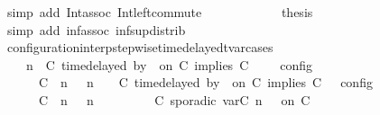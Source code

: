 \begin{isabellebody}
\ {\isacharparenleft}simp\ add{\isacharcolon}\ Int{\isacharunderscore}assoc\ Int{\isacharunderscore}left{\isacharunderscore}commute{\isacharparenright}\isanewline
\ \ \ \ \isamarkupfalse%
\isanewline
\ \ \ \ \isamarkupfalse%
\ \isamarkupfalse%
\ {\isacharquery}thesis\ \isamarkupfalse%
\ {\isacharparenleft}simp\ add{\isacharcolon}\ inf{\isacharunderscore}assoc\ inf{\isacharunderscore}sup{\isacharunderscore}distrib{}{\isacharparenright}\isanewline
\ \ \isamarkupfalse%
\isanewline
{}\isamarkupfalse%
%
\endisatagproof
{\isafoldproof}%
%
\isadelimproof
\isanewline
%
\endisadelimproof
\isanewline
{}\isamarkupfalse%
\ configuration{\isacharunderscore}interp{\isacharunderscore}stepwise{\isacharunderscore}timedelayed{\isacharunderscore}tvar{\isacharunderscore}cases{\isacharcolon}\isanewline
\ \ {\isacartoucheopen}{\isasymlbrakk}\ {\isasymGamma}{\isacharcomma}\ n\ {\isasymturnstile}\ {\isacharparenleft}{\isacharparenleft}C\ time{\isacharminus}delayed{\isasymbowtie}\ by\ {\isasymdelta}{\isasymtau}\ on\ C\ implies\ C\ {\isacharhash}\ {\isasymPsi}{\isacharparenright}\ {\isasymtriangleright}\ {\isasymPhi}\ {\isasymrbrakk}\isactrlsub c\isactrlsub o\isactrlsub n\isactrlsub f\isactrlsub i\isactrlsub g\isanewline
\ \ \ \ {\isacharequal}\ {\isasymlbrakk}\ {\isacharparenleft}{\isacharparenleft}C\ {\isasymnot}{\isasymUp}\ n{\isacharparenright}\ {\isacharhash}\ {\isasymGamma}{\isacharparenright}{\isacharcomma}\ n\ {\isasymturnstile}\ {\isasymPsi}\ {\isasymtriangleright}\ {\isacharparenleft}{\isacharparenleft}C\ time{\isacharminus}delayed{\isasymbowtie}\ by\ {\isasymdelta}{\isasymtau}\ on\ C\ implies\ C\ {\isacharhash}\ {\isasymPhi}{\isacharparenright}\ {\isasymrbrakk}\isactrlsub c\isactrlsub o\isactrlsub n\isactrlsub f\isactrlsub i\isactrlsub g\isanewline
\ \ \ \ {\isasymunion}\ {\isasymlbrakk}\ {\isacharparenleft}{\isacharparenleft}C\ {\isasymUp}\ n{\isacharparenright}\ {\isacharhash}\ {\isasymGamma}{\isacharparenright}{\isacharcomma}\ n\isanewline
\ \ \ \ \ \ \ \ {\isasymturnstile}\ {\isacharparenleft}C\ sporadic{\isasymsharp}\ {\isasymlparr}{\isasymtau}\isactrlsub v\isactrlsub a\isactrlsub r{\isacharparenleft}C\ n{\isacharparenright}\ {\isasymoplus}\ {\isasymdelta}{\isasymtau}{\isasymrparr}\ on\ C\ {\isacharhash}\ {\isasymPsi}\isanewline

\end{isabellebody}
